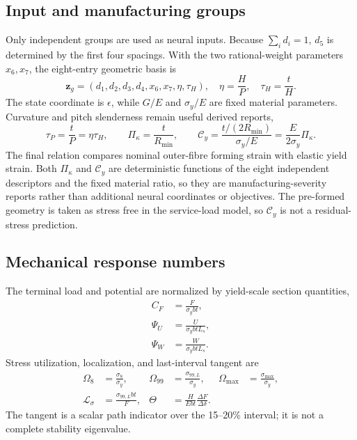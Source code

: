 \documentclass[11pt]{article}
\newcommand{\Rmin}{R_{\min}}
\newcommand{\PsiU}{\Psi_{U}}
\newcommand{\PsiW}{\Psi_{W}}
\newcommand{\Om}{\Omega_{8}}
\newcommand{\Ommax}{\Omega_{\max}}
\begin{document}
\subsection{Input and manufacturing groups}

Only independent groups are used as neural inputs. Because $\sum_i d_i=1$, $d_5$ is determined by the first four spacings. With the two rational-weight parameters $x_6,x_7$, the eight-entry geometric basis is
\begin{equation}
\bm z_g=\left(d_1,d_2,d_3,d_4,x_6,x_7,
\eta,\tau_H\right),
\quad
\eta=\frac{H}{P},\quad
\tau_H=\frac{t}{H}.
\label{eq:input_groups}
\end{equation}
The state coordinate is $\epsilon$, while $G/E$ and $\sigma_y/E$ are fixed material parameters. Curvature and pitch slenderness remain useful derived reports,
\begin{equation}
\tau_P=\frac{t}{P}=\eta\tau_H,\qquad
\Pi_\kappa=\frac{t}{\Rmin},\qquad
\mathcal C_y=\frac{t/(2\Rmin)}{\sigma_y/E}
=\frac{E}{2\sigma_y}\Pi_\kappa.
\label{eq:derived_groups}
\end{equation}
The final relation compares nominal outer-fibre forming strain with elastic yield strain. Both $\Pi_\kappa$ and $\mathcal C_y$ are deterministic functions of the eight independent descriptors and the fixed material ratio, so they are manufacturing-severity reports rather than additional neural coordinates or objectives.
The pre-formed geometry is taken as stress free in the service-load model, so $\mathcal C_y$ is not a residual-stress prediction.

\subsection{Mechanical response numbers}

The terminal load and potential are normalized by yield-scale section quantities,
\begin{align}
C_F&=\frac{F}{\sigma_ybt},\label{eq:load_number}\\
\PsiU&=\frac{U}{\sigma_ybtL_s},\label{eq:potential_number}\\
\PsiW&=\frac{W}{\sigma_ybtL_s}.\label{eq:work_number}
\end{align}
Stress utilization, localization, and last-interval tangent are
\begin{align}
\Om&=\frac{\sigma_8}{\sigma_y},
&\Omega_{99}&=\frac{\sigma_{99,L}}{\sigma_y},
&\Ommax&=\frac{\sigma_{\max}}{\sigma_y},\label{eq:stress_numbers}\\
\mathcal L_\sigma&=\frac{\sigma_{99,L}bt}{F},
&\Theta&=\frac{H}{Ebt}\frac{\Delta F}{\Delta\delta}.
\label{eq:localization_tangent}
\end{align}
The tangent is a scalar path indicator over the 15--20\% interval; it is not a complete stability eigenvalue.
\end{document}
